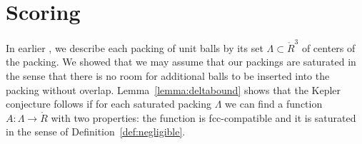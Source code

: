 %
%
%







\chapter{Scoring}

\label{sec:scoring}

In earlier \chaps, we describe each packing of unit balls by its set
$\Lambda\subset \ring{R}^3$ of centers of the packing.  We showed
that we may assume that our packings are saturated in the sense that
there is no room for additional balls to be inserted into the
packing without overlap. Lemma~\ref{lemma:deltabound} shows that the
Kepler conjecture follows if for each saturated packing $\Lambda$ we
can find a function $A:\Lambda\to\ring{R}$ with two properties: the
function is fcc-compatible and it is saturated in the sense of
Definition~\ref{def:negligible}.

